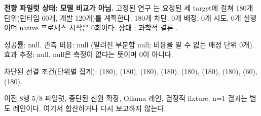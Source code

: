 \textbf{전향 파일럿 상태: 모델 비교가 아님.} 고정된 연구 \texttt{}는 요청된 세 target에 걸쳐 180개 단위(런타임 60개, 개발 120개)를 계획한다. 180개 차단, 0개 배정, 0개 시도, 0개 실행이며 native 프로세스 시작은 0회이다. 상태 \texttt{}; 과학적 결론 \texttt{}.

성공률: null. 관측 비용: null (알려진 부분합 null; 비용을 알 수 없는 배정 단위 0개). 효과 추정: null. null은 측정이 없다는 뜻이며 0이 아니다.

차단된 선결 조건(단위별 집계): \texttt{} (180), \texttt{} (180), \texttt{} (180), \texttt{} (180), \texttt{} (180), \texttt{} (180), \texttt{} (180), \texttt{} (60), \texttt{} (180).

이전 8행 5/8 파일럿, 중단된 신원 확장, Ollama 레인, 결정적 fixture, n=1 결과는 별도 레인이다. 여기서 합산하거나 다시 보고하지 않는다.
